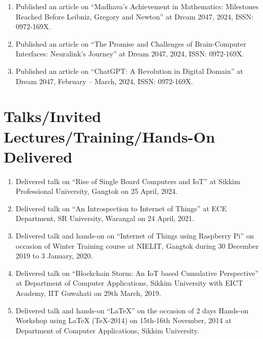 \documentclass[11pt,a4paper]{moderncv}
\begin{document}
\begin{adjustwidth}{6em}{0pt}
	\begin{enumerate}
		
		\item Published an article on “Madhava’s Achievement in Mathematics: Milestones Reached Before Leibniz, Gregory and Newton” at Dream 2047, 2024, ISSN: 0972-169X.
		
		\item Published an article on “The Promise and Challenges of Brain-Computer Interfaces: Neuralink’s Journey” at Dream 2047, 2024, ISSN: 0972-169X.
		
		\item Published an article on “ChatGPT: A Revolution in Digital Domain” at Dream 2047, February – March, 2024, ISSN: 0972-169X.
		
	\end{enumerate}
\end{adjustwidth}



\section{\textbf{Talks/Invited Lectures/Training/Hands-On Delivered}}

\begin{adjustwidth}{6em}{0pt}
	\begin{enumerate}
		
		\item Delivered talk on “Rise of Single Board Computers and IoT” at Sikkim Professional University, Gangtok on 25 April, 2024.
		
		\item Delivered talk on “An Introspection to Internet of Things” at ECE Department, SR University, Warangal on 24 April, 2021.
		
		\item Delivered talk and hands-on on “Internet of Things using Raspberry Pi” on occasion of Winter Training course at NIELIT, Gangtok during 30 December 2019 to 3 January, 2020.
		
		\item Delivered talk on “Blockchain Storm: An IoT based Cumulative Perspective” at Department of Computer Applications, Sikkim University with EICT Academy, IIT Guwahati on 29th March, 2019.
		
		\item Delivered talk and hands-on “LaTeX” on the occasion of 2 days Hands-on Workshop using LaTeX (TeX-2014) on 15th-16th November, 2014 at Department of Computer Applications, Sikkim University.
		
	\end{enumerate}
\end{adjustwidth}
\end{document}
